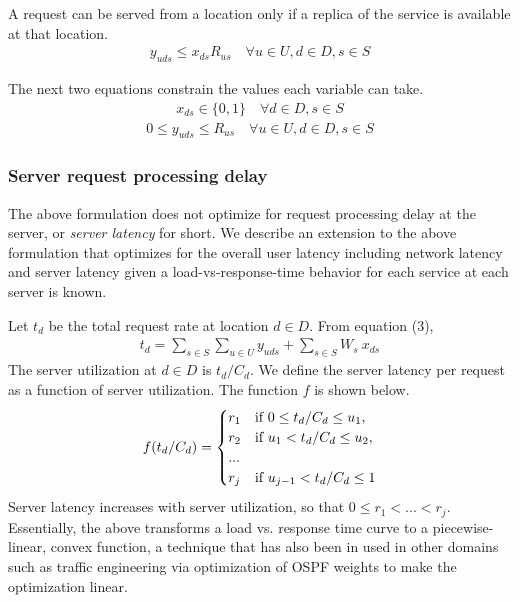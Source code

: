 A request can be served from a location only if a replica of the service is available at that location.
\begin{eqnarray}
y_{uds} \leq x_{ds} R_{us}\quad \forall u \in U, d \in D , s \in S
\end{eqnarray}


The next two equations constrain the values each variable can take.
\begin{eqnarray}
x_{ds} \in \{0, 1\} \quad \forall d \in D, s \in S
\end{eqnarray}
\begin{eqnarray}
0 \leq y_{uds} \leq R_{us} \quad \forall u \in U, d \in D , s \in S
\end{eqnarray}


\subsubsection{Server request processing delay}

The above formulation does not optimize for request processing delay at the server, or \emph{server latency} for short. We describe an extension to the above formulation that optimizes for the overall user latency including network latency and server latency given a load-vs-response-time behavior for each service at each server is known.

Let $t_d$ be the total request rate at location $d \in D$. From equation (3),
\begin{eqnarray}
t_d = \sum_{s \in S} \sum_{u \in U} y_{uds} + \sum_{s \in S} W_s\ x_{ds} 
\end{eqnarray}
The server utilization at $d \in D$ is $t_d / C_d$.  We define the server latency per request as a function  of server utilization. The function $f$ is shown below.
\begin{eqnarray}
f (t_d / C_d)   =  \begin{cases}  r_1 & \text{if } 0 \leq t_d / C_d \leq u_1,  \notag \\
r_2 & \text{if } u_1 < t_d / C_d \leq u_2,  \notag \\
... & \notag \\
r_j & \text{if } u_{j - 1} < t_d / C_d \leq 1  \notag \end{cases}\\
\end{eqnarray}
Server latency increases with server utilization, so that $0 \leq r_1  < ... < r_j$. Essentially, the above transforms a load vs. response time curve to a piecewise-linear, convex function, a technique that has also been in used in other domains such as traffic engineering via optimization of OSPF weights \cite{fortz2000Internet} to make the optimization linear.

